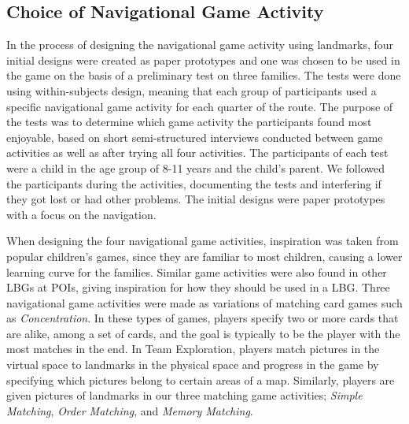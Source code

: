 \subsection{Choice of Navigational Game Activity}
In the process of designing the navigational game activity using landmarks, four initial designs were created as paper prototypes and one was chosen to be used in the game on the basis of a preliminary test on three families. The tests were done using within-subjects design, meaning that each group of participants used a specific navigational game activity for each quarter of the route. The purpose of the tests was to determine which game activity the participants found most enjoyable, based on short semi-structured interviews conducted between game activities as well as after trying all four activities. The participants of each test were a child in the age group of 8-11 years and the child's parent. We followed the participants during the activities, documenting the tests and interfering if they got lost or had other problems. The initial designs were paper prototypes with a focus on the navigation. %

When designing the four navigational game activities, inspiration was taken from popular children's games, since they are familiar to most children, causing a lower learning curve for the families. Similar game activities were also found in other LBGs at POIs, giving inspiration for how they should be used in a LBG. Three navigational game activities were made as variations of matching card games such as \textit{Concentration}\cite{childrensGames}. In these types of games, players specify two or more cards that are alike, among a set of cards, and the goal is typically to be the player with the most matches in the end. In Team Exploration\cite{GamingOnTheMove}, players match pictures in the virtual space to landmarks in the physical space and progress in the game by specifying which pictures belong to certain areas of a map. Similarly, players are given pictures of landmarks in our three matching game activities; \textit{Simple Matching}, \textit{Order Matching}, and \textit{Memory Matching}.

